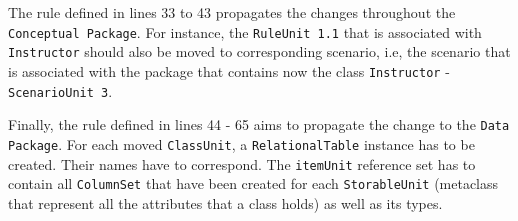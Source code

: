 The rule defined in lines 33 to 43 propagates the changes throughout the \texttt{Conceptual Package}. For instance,  the \texttt{RuleUnit 1.1} that is associated with \texttt{Instructor} should also be moved to corresponding scenario, i.e, the scenario that is associated with the package that contains now the class \texttt{Instructor} - \texttt{ScenarioUnit 3}. 

 Finally, the rule defined in lines 44 - 65 aims to propagate the change to the \texttt{Data Package}. For each moved \texttt{ClassUnit}, a \texttt{RelationalTable} instance has to be created. Their names have to correspond. The \texttt{itemUnit} %
reference set has to contain all \texttt{ColumnSet} that have been created for each \texttt{StorableUnit} (metaclass that represent all the attributes that a class holds) as well as its types.




